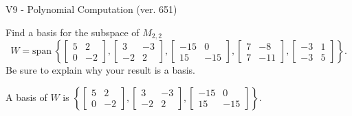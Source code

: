 \begin{exercise}
  \begin{exerciseTitle}V9 - Polynomial Computation (ver. 651)\end{exerciseTitle}
  \begin{exerciseStatement}
    Find a basis for the subspace of \(M_{2,2}\) 
\[W=\mathrm{span}\ \left\{\left[\begin{array}{cc}
5 & 2 \\
0 & -2
\end{array}\right] , \left[\begin{array}{cc}
3 & -3 \\
-2 & 2
\end{array}\right] , \left[\begin{array}{cc}
-15 & 0 \\
15 & -15
\end{array}\right] , \left[\begin{array}{cc}
7 & -8 \\
7 & -11
\end{array}\right] , \left[\begin{array}{cc}
-3 & 1 \\
-3 & 5
\end{array}\right]\right\}.\]
 Be sure to explain why your result is a basis.


  \end{exerciseStatement}
  \begin{exerciseAnswer}
   A basis of \(W\) is  \(\left\{\left[\begin{array}{cc}
5 & 2 \\
0 & -2
\end{array}\right] , \left[\begin{array}{cc}
3 & -3 \\
-2 & 2
\end{array}\right] , \left[\begin{array}{cc}
-15 & 0 \\
15 & -15
\end{array}\right]\right\}\).
  


  \end{exerciseAnswer}
\end{exercise}